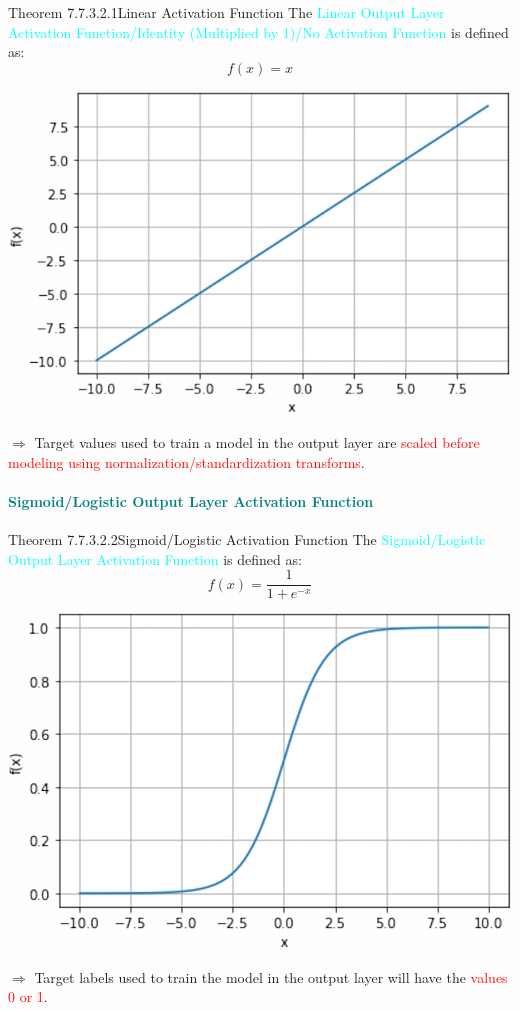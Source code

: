 \documentclass{book}
\begin{document}
\begin{thmBox}{Theorem 7.7.3.2.1}{Linear Activation Function}
    The \textcolor{cyan}{Linear Output Layer Activation Function/Identity (Multiplied by 1)/No Activation Function} is defined as:
    \[
        f(x) = x
    \]
    \begin{center}
        \includegraphics[scale=0.25]{chapter 7/ch7_figure35.jpeg}
    \end{center}
    $\Rightarrow$ Target values used to train a model in the output layer are \textcolor{red}{scaled before modeling using normalization/standardization transforms}.
\end{thmBox}
\textcolor{teal}{\paragraph{Sigmoid/Logistic Output Layer Activation Function}}
\begin{thmBox}{Theorem 7.7.3.2.2}{Sigmoid/Logistic Activation Function}
    The \textcolor{cyan}{Sigmoid/Logistic Output Layer Activation Function} is defined as:
    \[
        f(x) = \frac{1}{1+e^{-x}}
    \]
    \begin{center}
        \includegraphics[scale=0.17]{chapter 7/ch7_figure33.jpeg}
    \end{center}
    $\Rightarrow$ Target labels used to train the model in the output layer will have the \textcolor{red}{values 0 or 1}.
\end{thmBox}
\end{document}
